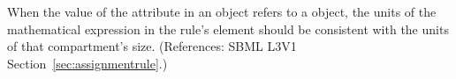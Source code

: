 When the value of the attribute  in an \AssignmentRule
object refers to a \Compartment object, the units of the mathematical
expression in the rule's  element should be consistent with the
units of that compartment's size.  (References: SBML L3V1
Section~\ref{sec:assignmentrule}.)
